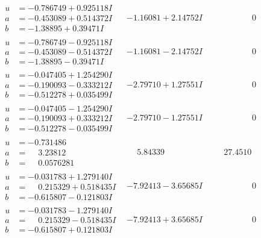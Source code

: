 \documentclass[1p]{elsarticle_modified}
\theoremstyle{definition}
\begin{document}
$$\begin{array}{c|c|c}
\begin{aligned}
u &= -0.786749 + 0.925118 I \\
a &= -0.453089 + 0.514372 I \\
b &= -1.38895 + 0.39471 I\end{aligned}
 & -1.16081 + 2.14752 I & \phantom{-0.000000 } 0 \\ \hline\begin{aligned}
u &= -0.786749 - 0.925118 I \\
a &= -0.453089 - 0.514372 I \\
b &= -1.38895 - 0.39471 I\end{aligned}
 & -1.16081 - 2.14752 I & \phantom{-0.000000 } 0 \\ \hline\begin{aligned}
u &= -0.047405 + 1.254290 I \\
a &= -0.190093 - 0.333212 I \\
b &= -0.512278 + 0.035499 I\end{aligned}
 & -2.79710 + 1.27551 I & \phantom{-0.000000 } 0 \\ \hline\begin{aligned}
u &= -0.047405 - 1.254290 I \\
a &= -0.190093 + 0.333212 I \\
b &= -0.512278 - 0.035499 I\end{aligned}
 & -2.79710 - 1.27551 I & \phantom{-0.000000 } 0 \\ \hline\begin{aligned}
u &= -0.731486\phantom{ +0.000000I} \\
a &= \phantom{-}3.23812\phantom{ +0.000000I} \\
b &= \phantom{-}0.0576281\phantom{ +0.000000I}\end{aligned}
 & \phantom{-}5.84339\phantom{ +0.000000I} & \phantom{-}27.4510\phantom{ +0.000000I} \\ \hline\begin{aligned}
u &= -0.031783 + 1.279140 I \\
a &= \phantom{-}0.215329 + 0.518435 I \\
b &= -0.615807 - 0.121803 I\end{aligned}
 & -7.92413 - 3.65685 I & \phantom{-0.000000 } 0 \\ \hline\begin{aligned}
u &= -0.031783 - 1.279140 I \\
a &= \phantom{-}0.215329 - 0.518435 I \\
b &= -0.615807 + 0.121803 I\end{aligned}
 & -7.92413 + 3.65685 I & \phantom{-0.000000 } 0 \\ \hline\begin{aligned}

\end{aligned}
\end{array}$$
\end{document}
